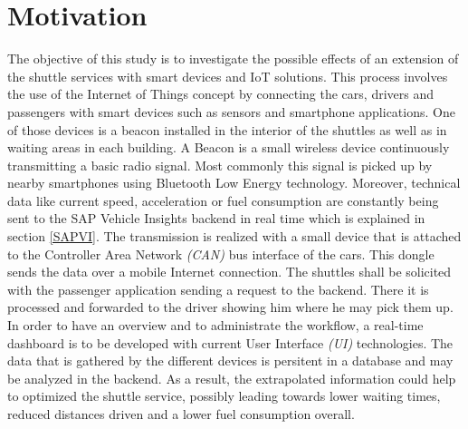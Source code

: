 \section{Motivation}
The objective of this study is to investigate the possible effects of an
extension of the shuttle services with smart devices and IoT solutions. This
process involves the use of the Internet of Things concept by connecting the
cars, drivers and passengers with smart devices such as sensors and smartphone
applications.
\newline One of those devices is a beacon installed in the interior of the
shuttles as well as in waiting areas in each building. A Beacon is a small
wireless device continuously transmitting a basic radio signal. Most commonly
this signal is picked up by nearby smartphones using Bluetooth Low Energy
technology. \cite{beacon1}\cite{beacon2} Moreover, technical data like current
speed, acceleration or fuel consumption are constantly being sent to the SAP
Vehicle Insights backend in real time which is explained in section \ref{SAPVI}.
The transmission is realized with a small device that is attached to the
Controller Area Network \emph{(CAN)} bus interface of the cars. This dongle
sends the data over a mobile Internet connection.
\newline The shuttles shall be solicited with the passenger application sending
a request to the backend. There it is processed and forwarded to the driver
showing him where he may pick them up.
In order to have an overview and to administrate the workflow, a real-time
dashboard is to be developed with current User Interface \emph{(UI)}
technologies.
The data that is gathered by the different devices is persitent in a database
and may be analyzed in the backend. As a result, the extrapolated information
could help to optimized the shuttle service, possibly leading towards lower
waiting times, reduced distances driven and a lower fuel consumption overall.
\newline

